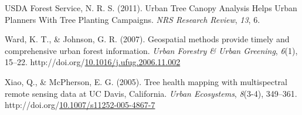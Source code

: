 \documentclass[12pt,twoside]{reedthesis}
\newlength{\cslhangindent}
\newenvironment{CSLReferences}[2] %
 {%
  \setlength{\parindent}{0pt}
  \ifodd #1 \everypar{\setlength{\hangindent}{\cslhangindent}}\ignorespaces\fi
  \ifnum #2 > 0
  \setlength{\parskip}{#2\baselineskip}
  \fi
 }%
 {}
\begin{document}
\begin{CSLReferences}{1}{0}
\leavevmode{}%
USDA Forest Service, N. R. S. (2011). Urban Tree Canopy Analysis Helps Urban Planners With Tree Planting Campaigns. \emph{NRS Research Review}, \emph{13}, 6.

\leavevmode{}%
Ward, K. T., \& Johnson, G. R. (2007). Geospatial methods provide timely and comprehensive urban forest information. \emph{Urban Forestry \& Urban Greening}, \emph{6}(1), 15--22. http://doi.org/\href{https://doi.org/10.1016/j.ufug.2006.11.002}{10.1016/j.ufug.2006.11.002}

\leavevmode{}%
Xiao, Q., \& McPherson, E. G. (2005). Tree health mapping with multispectral remote sensing data at UC Davis, California. \emph{Urban Ecosystems}, \emph{8}(3-4), 349--361. http://doi.org/\href{https://doi.org/10.1007/s11252-005-4867-7}{10.1007/s11252-005-4867-7}

\end{CSLReferences}

\end{document}
